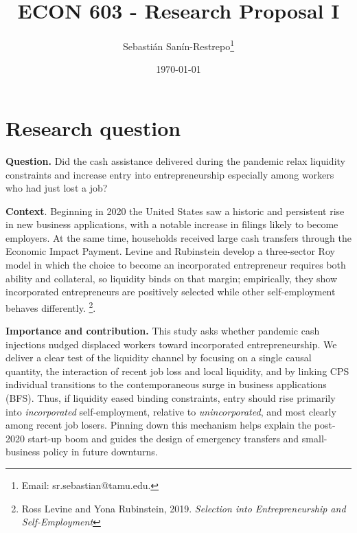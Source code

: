 



\title{\Large \textbf{ECON 603 - Research Proposal I}}

\author{Sebasti\'an San\'in-Restrepo\thanks{Email: sr.sebastian@tamu.edu.}} 
\date{\today}

\maketitle
\thispagestyle{empty} 
\doublespacing
\thispagestyle{empty} 

\vspace{-10mm}

\doublespacing

\section{ Research question}

\noindent \textbf{Question.} Did the cash assistance delivered during the pandemic relax liquidity constraints and increase entry into entrepreneurship especially among workers who had just lost a job?


\medskip
\noindent
\textbf{Context}. Beginning in 2020 the United States saw a historic and persistent rise in new business applications, with a notable increase in filings likely to become employers. At the same time, households received large cash transfers through the Economic Impact Payment. Levine and Rubinstein develop a three-sector Roy model in which the choice to become an incorporated entrepreneur requires both ability and collateral, so liquidity binds on that margin; empirically, they show incorporated entrepreneurs are positively selected while other self-employment behaves differently. \footnote{Ross Levine and Yona Rubinstein, 2019. \textit{Selection into Entrepreneurship and Self-Employment}}. 

\noindent \textbf{Importance and contribution.} This study asks whether pandemic cash injections nudged displaced workers toward incorporated entrepreneurship. We deliver a clear test of the liquidity channel by focusing on a single causal quantity, the interaction of recent job loss and local liquidity, and by linking CPS individual transitions to the contemporaneous surge in business applications (BFS). Thus, if liquidity eased binding constraints, entry should rise primarily into \textit{incorporated} self-employment, relative to \textit{unincorporated}, and most clearly among recent job losers. Pinning down this mechanism helps explain the post-2020 start-up boom and guides the design of emergency transfers and small-business policy in future downturns.

